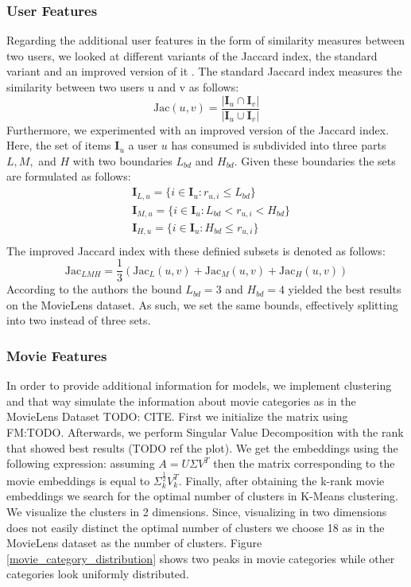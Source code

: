 \documentclass[10pt,conference,compsocconf]{IEEEtran}
\begin{document}
    \subsubsection{User Features}
    Regarding the additional user features in the form of similarity measures between two users, we looked at different variants of the Jaccard index, the standard variant and an improved version of it \cite{lee_improving_2017}.
    The standard Jaccard index measures the similarity between two users u and v as follows:
    $$\text{Jac}(u,v)=\frac{|\mathbf{I}_u \cap \mathbf{I}_v|}{|\mathbf{I}_u \cup \mathbf{I}_v|}$$
    Furthermore, we experimented with an improved version of the Jaccard index.
    Here, the set of items $\mathbf{I}_u$ a user $u$ has consumed is subdivided into three parts $L,M,$ and $H$ with two boundaries $L_{bd}$ and $H_{bd}$.
    Given these boundaries the sets are formulated as follows:
    \begin{align*}
          &\mathbf{I}_{L,u}=\{i \in \mathbf{I}_u : r_{u,i} \leq L_{bd}\}\\
          &\mathbf{I}_{M,u}=\{i \in \mathbf{I}_u : L_{bd} < r_{u,i} < H_{bd}\}\\
          &\mathbf{I}_{H,u}=\{i \in \mathbf{I}_u : H_{bd} \leq r_{u,i}\}\\
    \end{align*}
    The improved Jaccard index with these definied subsets is denoted as follows:
    $$\text{Jac}_{LMH}=\frac{1}{3}(\text{Jac}_L(u,v) + \text{Jac}_M(u,v) + \text{Jac}_H(u,v))$$
    According to the authors the bound $L_{bd} = 3$ and $H_{bd}=4$ yielded the best results on the MovieLens dataset.
    As such, we set the same bounds, effectively splitting into two instead of three sets.

    \subsubsection{Movie Features}
    In order to provide additional information for models, we implement clustering and that way simulate the information
    about movie categories as in the MovieLens Dataset TODO: CITE. First we initialize the matrix using FM:TODO.
    Afterwards, we perform Singular Value Decomposition with the rank that showed best results (TODO ref the plot).
    We get the embeddings using the following expression: assuming $A=U\Sigma V^T$ then the matrix corresponding to the movie embeddings is equal to $\Sigma _k ^{\frac{1}{2}} V_k ^T$.
    Finally, after obtaining the k-rank movie embeddings we search for the optimal number of clusters in K-Means clustering.
    We visualize the clusters in 2 dimensions. Since, visualizing in two dimensions does not easily distinct the optimal
    number of clusters we choose 18 as in the MovieLens dataset as the number of clusters. Figure \ref{movie_category_distribution}
    shows two peaks in movie categories while other categories look uniformly distributed.
\end{document}
